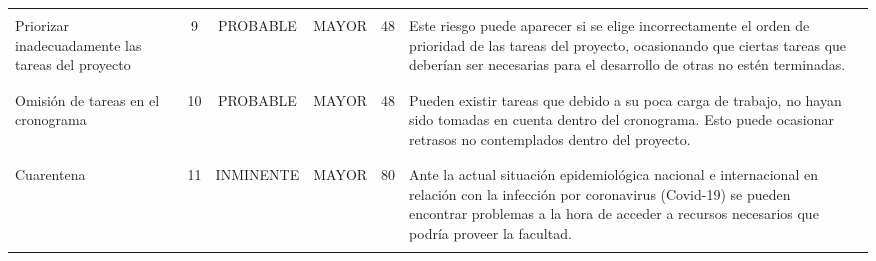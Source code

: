\begin{table}[h!]
\begin{tabular}{ p{3cm} c c c c p{4cm} p{4cm} }
            \\\\\hline
            
            &&&&&&\\
            Priorizar inadecuadamente las tareas del proyecto &
            9 &
            PROBABLE &
            MAYOR &
            48\cellcolor{yellow} &
            Este riesgo puede aparecer si se elige incorrectamente el orden de prioridad de las tareas del proyecto, ocasionando que ciertas tareas que deberían ser necesarias para el desarrollo de otras no estén terminadas. & 
            
            \\\\\hline
            
            &&&&&&\\
            Omisión de tareas en el cronograma &
            10 &
            PROBABLE &
            MAYOR &
            48\cellcolor{yellow} &
            Pueden existir tareas que debido a su poca carga de trabajo, no hayan sido tomadas en cuenta dentro del cronograma. Esto puede ocasionar retrasos no contemplados dentro del proyecto. & 
            
            \\\\\hline
            
            &&&&&&\\
            Cuarentena &
            11 &
            INMINENTE &
            MAYOR &
            80\cellcolor{red} &
            Ante la actual situación epidemiológica nacional e internacional en relación con la infección por coronavirus (Covid-19) se pueden encontrar problemas a la hora de acceder a recursos necesarios que podría proveer la facultad. & 
            
            \\\\
            
        \end{tabular}
    \end{table}
